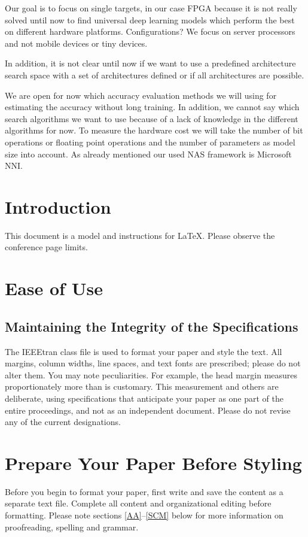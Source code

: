 \documentclass[conference]{IEEEtran}
\begin{document}
Our goal is to focus on single targets, in our case FPGA because it is not really solved until now to find universal deep learning models which perform the best on different hardware platforms. Configurations? We focus on server processors and not mobile devices or tiny devices. 

In addition, it is not clear until now if we want to use a predefined architecture search space with a set of architectures defined or if all architectures are possible. 

We are open for now which accuracy evaluation methods we will using for estimating the accuracy without long training. In addition, we cannot say which search algorithms we want to use because of a lack of knowledge in the different algorithms for now. To measure the hardware cost we will take the number of bit operations or floating point operations and the number of parameters as model size into account. As already mentioned our used NAS framework is Microsoft NNI. 


\clearpage

\section{Introduction}
This document is a model and instructions for \LaTeX.
Please observe the conference page limits. 

\section{Ease of Use}

\subsection{Maintaining the Integrity of the Specifications}

The IEEEtran class file is used to format your paper and style the text. All margins, 
column widths, line spaces, and text fonts are prescribed; please do not 
alter them. You may note peculiarities. For example, the head margin
measures proportionately more than is customary. This measurement 
and others are deliberate, using specifications that anticipate your paper 
as one part of the entire proceedings, and not as an independent document. 
Please do not revise any of the current designations.

\section{Prepare Your Paper Before Styling}
Before you begin to format your paper, first write and save the content as a 
separate text file. Complete all content and organizational editing before 
formatting. Please note sections \ref{AA}--\ref{SCM} below for more information on 
proofreading, spelling and grammar.
\end{document}
